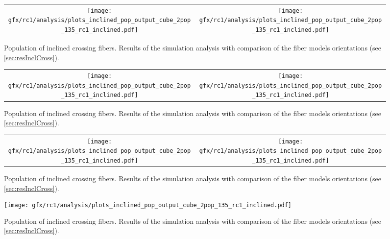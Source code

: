 %
\begin{sidewaysfigure}[!p]
    \centering
    \begin{tabular}{cc}
    \texttt{[image: gfx/rc1/analysis/plots\_inclined\_pop\_output\_cube\_2pop\_135\_rc1\_inclined.pdf]} &
    \texttt{[image: gfx/rc1/analysis/plots\_inclined\_pop\_output\_cube\_2pop\_135\_rc1\_inclined.pdf]}
    \end{tabular}
    \caption[]{Population of inclined crossing fibers. Results of the simulation analysis with comparison of the fiber models orientations (see \cref{sec:resInclCross}).}
    \label{app:incl_fiber_pop_b}
\end{sidewaysfigure}
%
\begin{sidewaysfigure}[!p]
    \centering
    \begin{tabular}{cc}
    \texttt{[image: gfx/rc1/analysis/plots\_inclined\_pop\_output\_cube\_2pop\_135\_rc1\_inclined.pdf]} &
    \texttt{[image: gfx/rc1/analysis/plots\_inclined\_pop\_output\_cube\_2pop\_135\_rc1\_inclined.pdf]}
    \end{tabular}
    \caption[]{Population of inclined crossing fibers. Results of the simulation analysis with comparison of the fiber models orientations (see \cref{sec:resInclCross}).}
    \label{app:incl_fiber_pop_c}
\end{sidewaysfigure}
%
\begin{sidewaysfigure}[!p]
    \centering
    \begin{tabular}{cc}
    \texttt{[image: gfx/rc1/analysis/plots\_inclined\_pop\_output\_cube\_2pop\_135\_rc1\_inclined.pdf]} &
    \texttt{[image: gfx/rc1/analysis/plots\_inclined\_pop\_output\_cube\_2pop\_135\_rc1\_inclined.pdf]}
    \end{tabular}
    \caption[]{Population of inclined crossing fibers. Results of the simulation analysis with comparison of the fiber models orientations (see \cref{sec:resInclCross}).}
    \label{app:incl_fiber_pop_d}
\end{sidewaysfigure}
%
\begin{figure}[!p]
    \centering
    \texttt{[image: gfx/rc1/analysis/plots\_inclined\_pop\_output\_cube\_2pop\_135\_rc1\_inclined.pdf]}
    \caption[]{Population of inclined crossing fibers. Results of the simulation analysis with comparison of the fiber models orientations (see \cref{sec:resInclCross}).}
    \label{app:incl_fiber_pop_e}
\end{figure}